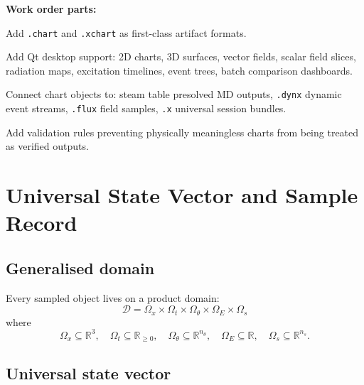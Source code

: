 \documentclass[11pt, a4paper, oneside]{article}
\begin{document}
\noindent\textbf{Work order parts:}

\begin{description}[leftmargin=2em]
  \item[Part A] Add \texttt{.chart} and \texttt{.xchart} as first-class artifact formats.
  \item[Part B] Add Qt desktop support: 2D charts, 3D surfaces, vector fields,
    scalar field slices, radiation maps, excitation timelines, event trees,
    batch comparison dashboards.
  \item[Part C] Connect chart objects to: steam table presolved MD outputs,
    \texttt{.dynx} dynamic event streams, \texttt{.flux} field samples,
    \texttt{.x} universal session bundles.
  \item[Part D] Add validation rules preventing physically meaningless charts
    from being treated as verified outputs.
\end{description}

\section{Universal State Vector and Sample Record}
\label{sec:universal}

\subsection{Generalised domain}

Every sampled object lives on a product domain:
\begin{equation}
  \mathcal{D}
  = \Omega_x \times \Omega_t \times \Omega_\theta
    \times \Omega_E \times \Omega_s
  \label{eq:domain}
\end{equation}
where
\[
  \Omega_x \subseteq \mathbb{R}^3,\quad
  \Omega_t \subseteq \mathbb{R}_{\geq 0},\quad
  \Omega_\theta \subseteq \mathbb{R}^{n_\theta},\quad
  \Omega_E \subseteq \mathbb{R},\quad
  \Omega_s \subseteq \mathbb{R}^{n_s}.
\]

\subsection{Universal state vector}
\end{document}
